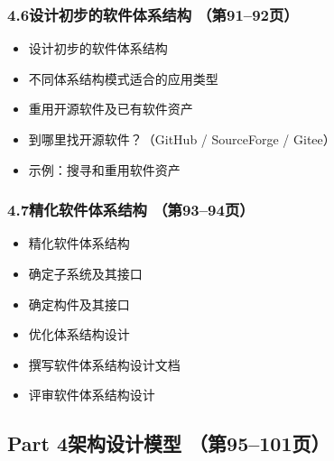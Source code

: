 \documentclass[12pt,a4paper]{ctexart}
\begin{document}
\subsubsection{4.6\quad 设计初步的软件体系结构 \hfill（第91--92页）}
\begin{itemize}
    \item 设计初步的软件体系结构
    \item 不同体系结构模式适合的应用类型
    \item 重用开源软件及已有软件资产
    \item 到哪里找开源软件？（GitHub / SourceForge / Gitee）
    \item 示例：搜寻和重用软件资产
\end{itemize}

\subsubsection{4.7\quad 精化软件体系结构 \hfill（第93--94页）}
\begin{itemize}
    \item 精化软件体系结构
    \item 确定子系统及其接口
    \item 确定构件及其接口
    \item 优化体系结构设计
    \item 撰写软件体系结构设计文档
    \item 评审软件体系结构设计
\end{itemize}

\subsection{Part 4\quad 架构设计模型 \hfill（第95--101页）}
\end{document}
